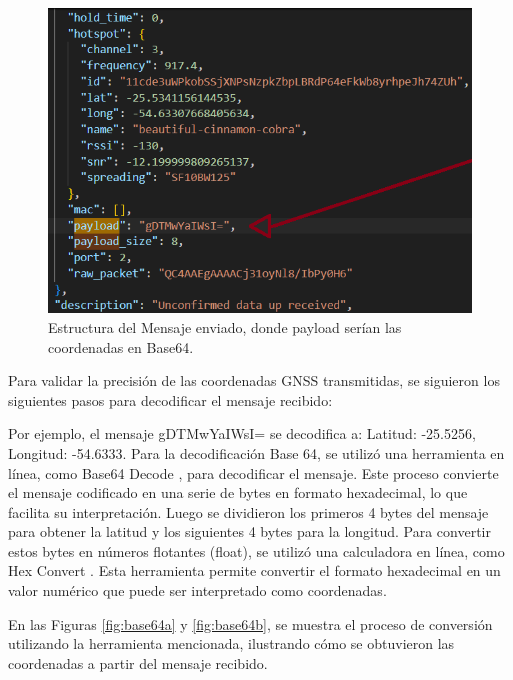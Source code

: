 \begin{figure}[H]
\leavevmode
\begin{minipage}{\textwidth}
\begin{center}
\includegraphics[width=\textwidth]{./capitulo_05/imagen/payload.png}
\caption{Estructura del Mensaje enviado, donde 
payload serían las coordenadas en Base64.\label{fig:Json}}
\end{center}
\end{minipage}
\end{figure}

Para validar la precisión de las coordenadas GNSS transmitidas, se siguieron los siguientes pasos para decodificar el mensaje recibido:


Por ejemplo, el mensaje gDTMwYaIWsI= se decodifica a: Latitud: -25.5256, Longitud: -54.6333.
Para la decodificación Base 64, se utilizó una herramienta en línea, como Base64 Decode \cite{Cryptii_Base64_to_Hex}, para decodificar el mensaje. Este proceso convierte el mensaje codificado en una serie de bytes en formato hexadecimal, lo que facilita su interpretación. Luego se dividieron los primeros 4 bytes del mensaje para obtener la latitud y los siguientes 4 bytes para la longitud. Para convertir estos bytes en números flotantes (float), se utilizó una calculadora en línea, como Hex Convert \cite{SCADACore_Hex_Converter}. Esta herramienta permite convertir el formato hexadecimal en un valor numérico que puede ser interpretado como coordenadas.


En las Figuras \ref{fig:base64a} y \ref{fig:base64b}, se muestra el proceso de conversión utilizando la herramienta mencionada, ilustrando cómo se obtuvieron las coordenadas a partir del mensaje recibido.

